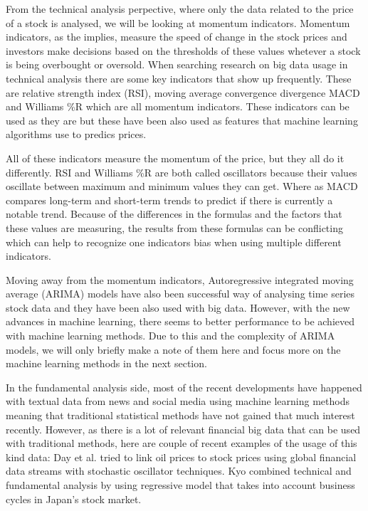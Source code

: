 From the technical analysis perpective, where only the data related to the price of a stock is analysed, we will be looking at momentum indicators. \cite{utthammajai}
Momentum indicators, as the implies, measure the speed of change in the stock prices and investors make decisions based on the thresholds of these values whetever a stock is being overbought or oversold. \cite{james}
When searching research on big data usage in technical analysis there are some key indicators that show up frequently.
These are relative strength index (RSI), moving average convergence divergence MACD and Williams \%R which are all momentum indicators.
These indicators can be used as they are but these have been also used as features that machine learning algorithms use to predics prices. \cite{serez}

All of these indicators measure the momentum of the price, but they all do it differently.
RSI and Williams \%R are both called oscillators because their values oscillate between maximum and minimum values they can get.
Where as MACD compares long-term and short-term trends to predict if there is currently a notable trend.
Because of the differences in the formulas and the factors that these values are measuring, the results from these formulas can be conflicting which can help to recognize one indicators bias when using multiple different indicators. \cite{james}

Moving away from the momentum indicators, Autoregressive integrated moving average (ARIMA) models have also been successful way of analysing time series stock data and they have been also used with big data. \cite{wang}
However, with the new advances in machine learning, there seems to better performance to be achieved with machine learning methods. \cite{khashei}
Due to this and the complexity of ARIMA models, we will only briefly make a note of them here and focus more on the machine learning methods in the next section.

In the fundamental analysis side, most of the recent developments have happened with textual data from news and social media using machine learning methods meaning that traditional statistical methods have not gained that much interest recently.
However, as there is a lot of relevant financial big data that can be used with traditional methods, here are couple of recent examples of the usage of this kind data:
Day et al. \cite{day} tried to link oil prices to stock prices using global financial data streams with stochastic oscillator techniques.
Kyo \cite{kyo} combined technical and fundamental analysis by using regressive model that takes into account business cycles in Japan's stock market.

